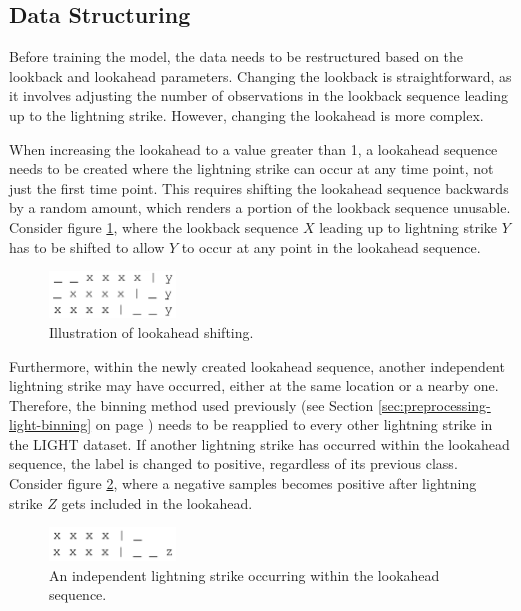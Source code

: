 \subsection{Data Structuring}

Before training the model, the data needs to be restructured based on the lookback and lookahead parameters. Changing the lookback is straightforward, as it involves adjusting the number of observations in the lookback sequence leading up to the lightning strike. However, changing the lookahead is more complex.

When increasing the lookahead to a value greater than 1, a lookahead sequence needs to be created where the lightning strike can occur at any time point, not just the first time point. This requires shifting the lookahead sequence backwards by a random amount, which renders a portion of the lookback sequence unusable. Consider figure \ref{fig:lookahead-one}, where the lookback sequence $X$ leading up to lightning strike $Y$ has to be shifted to allow $Y$ to occur at any point in the lookahead sequence.

\begin{figure}[h]
	\centering
	\includegraphics[width=0.3\textwidth, keepaspectratio]{figures/lookahead-one}
	\caption{Illustration of lookahead shifting.}
	\label{fig:lookahead-one}
\end{figure}

Furthermore, within the newly created lookahead sequence, another independent lightning strike may have occurred, either at the same location or a nearby one. Therefore, the binning method used previously (see Section \ref{sec:preprocessing-light-binning} on page \pageref{sec:preprocessing-light-binning}) needs to be reapplied to every other lightning strike in the LIGHT dataset. If another lightning strike has occurred within the lookahead sequence, the label is changed to positive, regardless of its previous class. Consider figure \ref{fig:lookahead-two}, where a negative samples becomes positive after lightning strike $Z$ gets included in the lookahead.

\begin{figure}[h]
	\centering
	\includegraphics[width=0.3\textwidth, keepaspectratio]{figures/lookahead-two}
	\caption{An independent lightning strike occurring within the lookahead sequence.}
	\label{fig:lookahead-two}
\end{figure}

